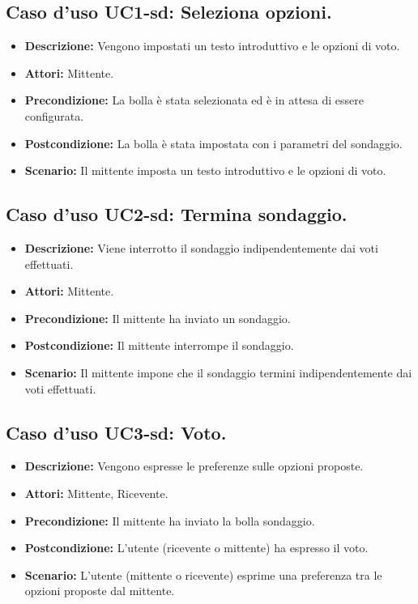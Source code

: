 \subsection{Caso d'uso UC1-sd: Seleziona opzioni.}
\begin{itemize}
\item[]\textbf{Descrizione:} Vengono impostati un testo introduttivo e le opzioni di voto.
\item[]\textbf{Attori:} Mittente. 
\item[]\textbf{Precondizione:} La bolla è stata selezionata ed è in attesa di essere configurata. 
\item[]\textbf{Postcondizione:} La bolla è stata impostata con i parametri del sondaggio. 
\item[]\textbf{Scenario:}
Il mittente imposta un testo introduttivo e le opzioni di voto. 
\end{itemize}

\subsection{Caso d'uso UC2-sd: Termina sondaggio.}
\begin{itemize}
\item[]\textbf{Descrizione:} Viene interrotto il sondaggio indipendentemente dai voti effettuati.
\item[]\textbf{Attori:} Mittente. 
\item[]\textbf{Precondizione:} Il mittente ha inviato un sondaggio. 
\item[]\textbf{Postcondizione:} Il mittente interrompe il sondaggio. 
\item[]\textbf{Scenario:}
Il mittente impone che il sondaggio termini indipendentemente dai voti effettuati. 
\end{itemize}

\subsection{Caso d'uso UC3-sd: Voto.}
\begin{itemize}
\item[]\textbf{Descrizione:} Vengono espresse le preferenze sulle opzioni proposte.
\item[]\textbf{Attori:} Mittente, Ricevente. 
\item[]\textbf{Precondizione:} Il mittente ha inviato la bolla sondaggio. 
\item[]\textbf{Postcondizione:} L'utente (ricevente o mittente) ha espresso il voto. 
\item[]\textbf{Scenario:}
L'utente (mittente o ricevente) esprime una preferenza tra le opzioni proposte dal mittente. 
\end{itemize}

